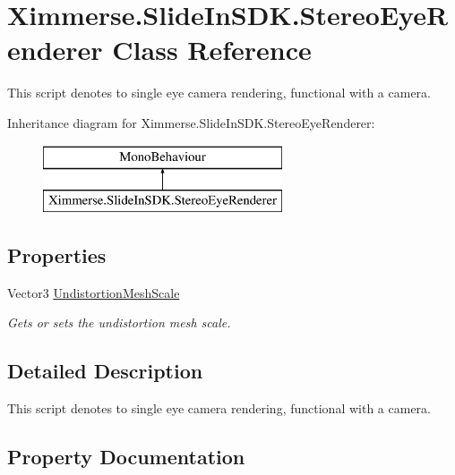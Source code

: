 \hypertarget{class_ximmerse_1_1_slide_in_s_d_k_1_1_stereo_eye_renderer}{}\section{Ximmerse.\+Slide\+In\+S\+D\+K.\+Stereo\+Eye\+Renderer Class Reference}
\label{class_ximmerse_1_1_slide_in_s_d_k_1_1_stereo_eye_renderer}


This script denotes to single eye camera rendering, functional with a camera.  


Inheritance diagram for Ximmerse.\+Slide\+In\+S\+D\+K.\+Stereo\+Eye\+Renderer\+:\begin{figure}[H]
\begin{center}
\leavevmode
\includegraphics[height=2.000000cm]{class_ximmerse_1_1_slide_in_s_d_k_1_1_stereo_eye_renderer}
\end{center}
\end{figure}
\subsection*{Properties}
\begin{DoxyCompactItemize}
\item 
Vector3 \mbox{\hyperlink{class_ximmerse_1_1_slide_in_s_d_k_1_1_stereo_eye_renderer_acba550673918829e1b82d9b157648a54}{Undistortion\+Mesh\+Scale}}
\begin{DoxyCompactList}\small\item\em Gets or sets the undistortion mesh scale. \end{DoxyCompactList}\end{DoxyCompactItemize}


\subsection{Detailed Description}
This script denotes to single eye camera rendering, functional with a camera. 



\subsection{Property Documentation}
\mbox{\label{class_ximmerse_1_1_slide_in_s_d_k_1_1_stereo_eye_renderer_acba550673918829e1b82d9b157648a54}} 

